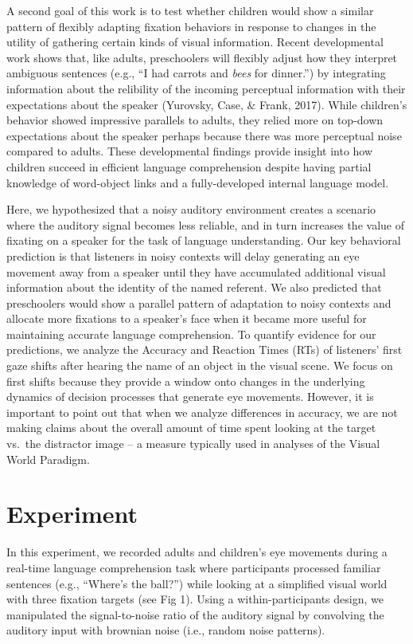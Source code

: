 \documentclass[10pt, letterpaper]{article}
\begin{document}
A second goal of this work is to test whether children would show a
similar pattern of flexibly adapting fixation behaviors in response to
changes in the utility of gathering certain kinds of visual information.
Recent developmental work shows that, like adults, preschoolers will
flexibly adjust how they interpret ambiguous sentences (e.g., ``I had
carrots and \emph{bees} for dinner.'') by integrating information about
the relibility of the incoming perceptual information with their
expectations about the speaker (Yurovsky, Case, \& Frank, 2017). While
children's behavior showed impressive parallels to adults, they relied
more on top-down expectations about the speaker perhaps because there
was more perceptual noise compared to adults. These developmental
findings provide insight into how children succeed in efficient language
comprehension despite having partial knowledge of word-object links and
a fully-developed internal language model.

Here, we hypothesized that a noisy auditory environment creates a
scenario where the auditory signal becomes less reliable, and in turn
increases the value of fixating on a speaker for the task of language
understanding. Our key behavioral prediction is that listeners in noisy
contexts will delay generating an eye movement away from a speaker until
they have accumulated additional visual information about the identity
of the named referent. We also predicted that preschoolers would show a
parallel pattern of adaptation to noisy contexts and allocate more
fixations to a speaker's face when it became more useful for maintaining
accurate language comprehension. To quantify evidence for our
predictions, we analyze the Accuracy and Reaction Times (RTs) of
listeners' first gaze shifts after hearing the name of an object in the
visual scene. We focus on first shifts because they provide a window
onto changes in the underlying dynamics of decision processes that
generate eye movements. However, it is important to point out that when
we analyze differences in accuracy, we are not making claims about the
overall amount of time spent looking at the target vs.~the distractor
image -- a measure typically used in analyses of the Visual World
Paradigm.

\section{Experiment}\label{experiment}

In this experiment, we recorded adults and children's eye movements
during a real-time language comprehension task where participants
processed familiar sentences (e.g., ``Where's the ball?'') while looking
at a simplified visual world with three fixation targets (see Fig 1).
Using a within-participants design, we manipulated the signal-to-noise
ratio of the auditory signal by convolving the auditory input with
brownian noise (i.e., random noise patterns).
\end{document}
